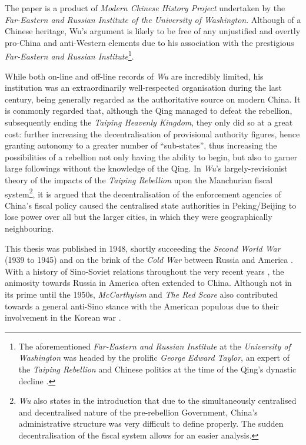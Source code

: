 \documentclass[a4paper,oneside]{article}
\begin{document}

The paper is a product of \textit{Modern Chinese History Project} undertaken by
the \textit{Far-Eastern and Russian Institute of the University of Washington}.
Although of a Chinese heritage, Wu's argument is likely to be free of any
unjustified and overtly pro-China and anti-Western elements due to his
association with the prestigious \textit{Far-Eastern and Russian
Institute}\footnote{The aforementioned \textit{Far-Eastern and Russian
Institute} at the \textit{University of Washington} was headed by the prolific
\textit{George Edward Taylor}, an expert of the \textit{Taiping Rebellion} and
Chinese politics at the time of the Qing's dynastic decline
\autocite{Taylor:1999}.}.

While both on-line and off-line records of \textit{Wu} are incredibly limited,
his institution was an extraordinarily well-respected organisation during the
last century, being generally regarded as the authoritative source on modern
China. It is commonly regarded that, although the Qing managed to defeat the
rebellion, subsequently ending the \textit{Taiping Heavenly Kingdom}, they only
did so at a great cost: further increasing the decentralisation of provisional
authority figures, hence granting autonomy to a greater number of
``sub-states'', thus increasing the possibilities of a rebellion not only having
the ability to begin, but also to garner large followings without the knowledge
of the Qing. In \textit{Wu}'s largely-revisionist theory of the impacts of the
\textit{Taiping Rebellion} upon the Manchurian fiscal
system\footnote{\textit{Wu} also states in the introduction that due to the
simultaneously centralised and decentralised nature of the pre-rebellion
Government, China's administrative structure was very difficult to define
properly. The sudden decentralisation of the fiscal system allows for an easier
analysis.}, it is argued that the decentralisation of the enforcement agencies
of China's fiscal policy caused the centralised state authorities in
Peking/Beijing to lose power over all but the larger cities, in which they were
geographically neighbouring.

This thesis was published in 1948, shortly succeeding the \textit{Second World
War} (1939 to 1945) and on the brink of the \textit{Cold War} between Russia and
America \autocite{Leffler:2010}. With a history of Sino-Soviet relations
throughout the very recent years \autocite{Garver:1989}, the animosity towards
Russia in America often extended to China. Although not in its prime until the
1950s, \textit{McCarthyism} and \textit{The Red Scare} also contributed towards
a general anti-Sino stance with the American populous due to their involvement
in the Korean war \autocite{Schrecker:1998}.
\end{document}
